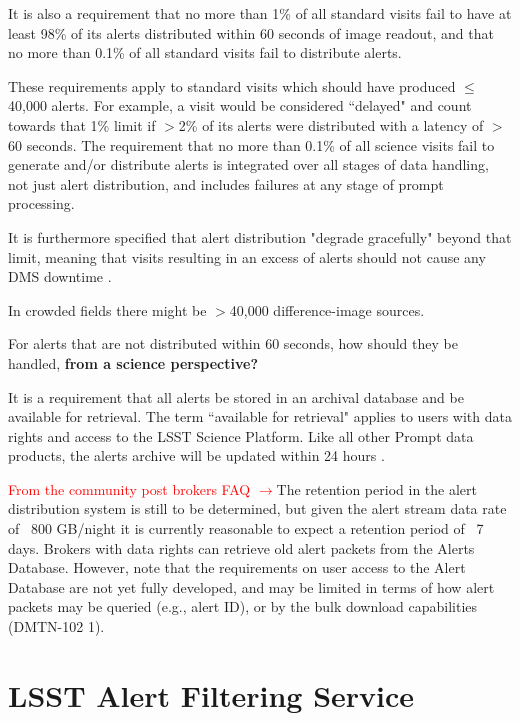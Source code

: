 \documentclass[DM,lsstdraft,authoryear,toc]{lsstdoc}
\begin{document}
It is also a requirement that no more than 1\% of all standard visits fail to have at least 98\% of its alerts distributed within 60 seconds of image readout, and that no more than 0.1\% of all standard visits fail to distribute alerts.

These requirements apply to standard visits which should have produced $\leq$40,000 alerts. For example, a visit would be considered ``delayed" and count towards that 1\% limit if $>$2\% of its alerts were distributed with a latency of $>$60 seconds. The requirement that no more than 0.1\% of all science visits fail to generate and/or distribute alerts is integrated over all stages of data handling, not just alert distribution, and includes failures at any stage of prompt processing.

It is furthermore specified that alert distribution "degrade gracefully" beyond that limit, meaning that visits resulting in an excess of alerts should not cause any DMS downtime .


In crowded fields there might be $>$40,000 difference-image sources.

For alerts that are not distributed within 60 seconds, how should they be handled, \textbf{from a science perspective?}

It is a requirement that all alerts be stored in an archival database and be available for retrieval. The term ``available for retrieval" applies to users with data rights and access to the LSST Science Platform. Like all other Prompt data products, the alerts archive will be updated within 24 hours .

\textcolor{red}{From the community post brokers FAQ $\rightarrow$}The retention period in the alert distribution system is still to be determined, but given the alert stream data rate of ~800 GB/night it is currently reasonable to expect a retention period of ~7 days. Brokers with data rights can retrieve old alert packets from the Alerts Database. However, note that the requirements on user access to the Alert Database are not yet fully developed, and may be limited in terms of how alert packets may be queried (e.g., alert ID), or by the bulk download capabilities (DMTN-102 1).



\clearpage
\section{LSST Alert Filtering Service}\label{sec:lafs}
\end{document}
